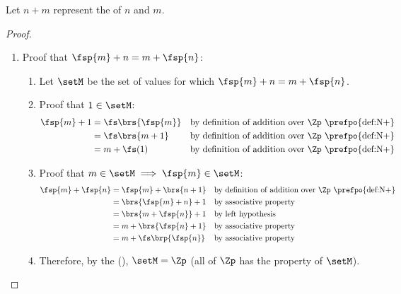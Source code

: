 \begin{lemma}
\label{lem:N+}
Let $n+m$ represent the  of $n$ and $m$.
\end{lemma}
\begin{proof}
\begin{enumerate}
  \item Proof that $\fsp{m} + n = m + \fsp{n}$:
    \begin{enumerate}
      \item Let $\setM$ be the set of values for which $\fsp{m} + n = m + \fsp{n}$.
      \item Proof that $1\in\setM$:
        \begin{align*}
          \fsp{m} + 1
            &= \fs\brs{\fsp{m}}
            && \text{by definition of addition over $\Zp$ \prefpo{def:N+}}
          \\&= \fs\brs{m+1}
            && \text{by definition of addition over $\Zp$ \prefpo{def:N+}}
          \\&= m + \fs(1)
            && \text{by definition of addition over $\Zp$ \prefpo{def:N+}}
        \end{align*}

      \item Proof that $m\in\setM\implies\fsp{m}\in\setM$:
        \begin{align*}
          \fsp{m} + \fsp{n}
            &= \fsp{m} + \brs{n+ 1}
            && \text{by definition of addition over $\Zp$ \prefpo{def:N+}}
          \\&= \brs{\fsp{m} + n} + 1
            && \text{by associative property}
          \\&= \brs{m + \fsp{n}} + 1
            && \text{by left hypothesis}
          \\&= m + \brs{\fsp{n} + 1}
            && \text{by associative property}
          \\&= m + \fs\brp{\fsp{n}}
            && \text{by associative property}
        \end{align*}

      \item Therefore, by the  (),
            $\setM=\Zp$ (all of $\Zp$ has the property of $\setM$).
    \end{enumerate}


\end{enumerate}
\end{proof}
